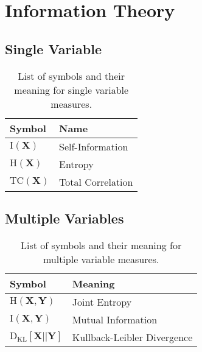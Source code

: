 \section{Information Theory}

\subsection{Single Variable}
\newcommand{\entropy}[1]{\text{H}\left(#1\right)}
\newcommand{\info}[1]{\text{I}\left(#1\right)}
\newcommand{\totalcorr}[1]{\text{TC}\left(#1\right)}




\begin{table}[h]
    \centering
    \caption{List of symbols and their meaning for single variable measures.}
    \begin{tabular}{m{7em}m{20em}}
        \toprule
        \textbf{Symbol}             & \textbf{Name} \\
        \midrule
        $\info{\mathbf{X}}$         & Self-Information\\
        $\entropy{\mathbf{X}}$      & Entropy \\
        $\totalcorr{\mathbf{X}}$    & Total Correlation \\
        \bottomrule
    \end{tabular}
    \label{tab:info_theory}
\end{table}


\subsection{Multiple Variables}


\newcommand{\jointentropy}[2]{\text{H}\left(#1,#2\right)}
\newcommand{\mutualinfo}[2]{\text{I}\left(#1,#2\right)}
\newcommand{\kld}[2]{\text{D}_{\text{KL}}\left[#1||#2\right]}


\begin{table}[h]
    \centering
    \caption{List of symbols and their meaning for multiple variable measures.}
    \begin{tabular}{m{7em}m{20em}}
        \toprule
        \textbf{Symbol} & \textbf{Meaning} \\
        \midrule
        $\jointentropy{\mathbf{X}}{\mathbf{Y}}$ & Joint Entropy \\
        $\mutualinfo{\mathbf{X}}{\mathbf{Y}}$   & Mutual Information \\
        $\kld{\mathbf{X}}{\mathbf{Y}}$          & Kullback-Leibler Divergence \\
        \bottomrule
    \end{tabular}
    \label{tab:info_theory}
\end{table}